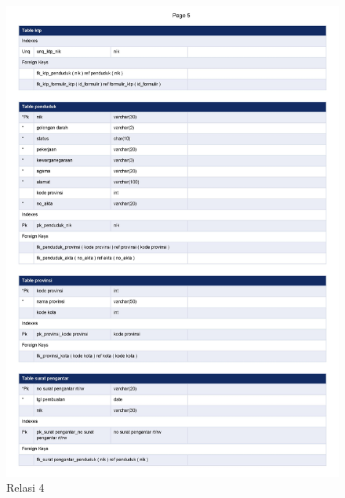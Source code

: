 \begin{figure}[H]
	\centering
	\includegraphics[width=12cm]{figures/0006.jpg}
	\caption{Relasi 4}
\end{figure}
